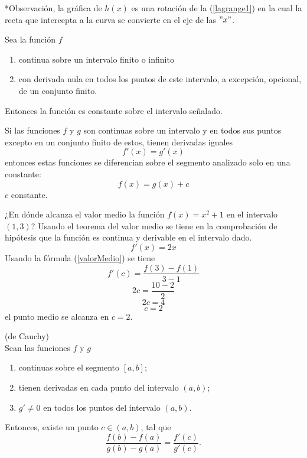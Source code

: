 \documentclass[10pt,twoside]{SelfArx} %
\begin{document}
 *Observación, la gráfica de $ h(x) $ es una rotación de la (\ref{lagrange1}) en la cual la recta que intercepta a la curva se convierte en el eje de las $ "x" $.
 \begin{corolario}
 	Sea la funci\'on $ f $
 	\begin{enumerate}
 		\item continua sobre un intervalo finito o infinito
 		\item con derivada nula en todos los puntos de este intervalo, a excepci\'on, opcional, de un conjunto finito.
 	\end{enumerate}
\textsf{ 	Entonces} la funci\'on es constante sobre el intervalo señalado.
 \end{corolario}
\begin{corolario}
	Si las funciones $ f $ y $ g $ son continuas sobre un intervalo y en todos sus puntos excepto en un conjunto finito de estos, tienen derivadas iguales
	\[ f'(x)=g'(x) \]
	entonces estas funciones se diferencian sobre el segmento analizado solo en una constante:
	\begin{equation}
	f(x)=g(x)+c
	\end{equation}
	$ c $ constante.
\end{corolario}
 \begin{ejemplo}
¿En dónde alcanza el valor medio la funci\'on $ f(x)=x^{2}+1  $ en el intervalo $ (1,3) $?
Usando el teorema del valor medio se tiene en la comprobación de hipótesis que la función es continua y derivable en el intervalo dado.
\begin{equation}
f'(x)=2x
\end{equation}
Usando la f\'ormula (\ref{valorMedio}) se tiene
\begin{equation}
f'(c)=\dfrac{f(3)-f(1)}{3-1}
\end{equation}
\begin{equation}
2c=\dfrac{10-2}{2}
\end{equation}
\begin{equation}
2c=4
\end{equation}
\begin{equation}
c=2
\end{equation}
el punto medio se alcanza en $ c=2 $.
 \end{ejemplo}
\begin{teorema}
	(de Cauchy)\\
	Sean las funciones $ f $ y $ g $
	\begin{enumerate}
		\item continuas sobre el segmento $ [a,b] $;
		\item tienen derivadas en cada punto del intervalo $ (a,b) $;
		\item $ g'\neq 0 $ en todos los puntos del intervalo $ (a,b) $.
	\end{enumerate}
	Entonces, existe un punto $ c\in (a,b) $, tal que
	\begin{equation}
	\dfrac{f(b)-f(a)}{g(b)-g(a)}=\dfrac{f'(c)}{g'(c)}.
	\end{equation}
\end{teorema} 
\end{document}
